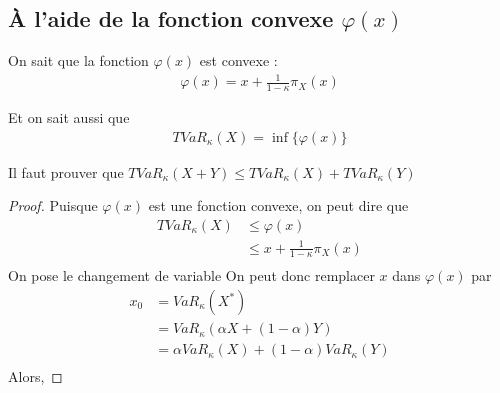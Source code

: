 \subsection{À l'aide de la fonction convexe $\varphi(x)$}


On sait que la fonction $\varphi(x)$ est convexe : 
\begin{align*}
\varphi(x) = x + \frac{1}{1 - \kappa} \pi_X(x)
\end{align*}

Et on sait aussi que 
\begin{align*}
TVaR_\kappa(X) = \inf \big \{ \varphi(x) \big \}
\end{align*}

Il faut prouver que $TVaR_\kappa(X + Y) \le TVaR_\kappa(X) + TVaR_\kappa(Y)$
\begin{proof}
Puisque $\varphi(x)$ est une fonction convexe, on peut dire que
\begin{align*}
TVaR_\kappa(X) & \le \varphi(x) \\
	& \le x + \frac{1}{1 - \kappa} \pi_X(x) \\ 
\end{align*} 
On pose le changement de variable 
\p
On peut donc remplacer $x$ dans $\varphi(x)$ par
\begin{align*}
x_0 & = VaR_\kappa(X^*) \\
	& = VaR_\kappa(\alpha X + (1-\alpha ) Y) \\
	& = \alpha VaR_\kappa(X) + (1-\alpha) VaR_\kappa(Y) \\
\end{align*}
Alors,


\end{proof}
